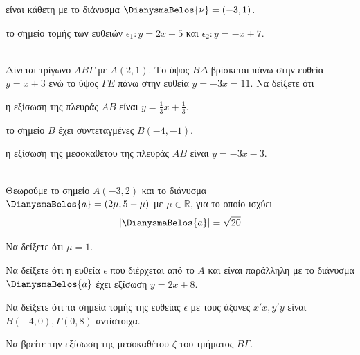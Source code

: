 \documentclass[twoside,nofonts,ektypwsh]{frontisthrio-diag}
\begin{document}
\begin{thema}
\begin{erwthma}
\item είναι κάθετη με το διάνυσμα $ \DianysmaBelos{\nu}=(-3,1) $.
\item το σημείο τομής των ευθειών $ \epsilon_1: y=2x-5 $ και $ \epsilon_2:y=-x+7 $.
\end{erwthma}
\item\mbox{}\\
Δίνεται τρίγωνο $ AB\varGamma $ με $ A(2,1) $. Το ύψος $ B\varDelta $ βρίσκεται πάνω στην ευθεία $ y=x+3 $ ενώ το ύψος $ \varGamma E $ πάνω στην ευθεία $ y=-3x=11 $. Να δείξετε ότι 
\begin{erwthma}
\item η εξίσωση της πλευράς $ AB $ είναι $ y=\frac{1}{3}x+\frac{1}{3} $.
\item  το σημείο $ B $ έχει συντεταγμένες $ B(-4,-1) $.
\item η εξίσωση της μεσοκαθέτου της πλευράς $ AB $ είναι $ y=-3x-3 $.
\end{erwthma}
\item\mbox{}\\
Θεωρούμε το σημείο $ A(-3,2) $ και το διάνυσμα $ \DianysmaBelos{a}=(2\mu,5-\mu) $ με $ \mu\in\mathbb{R} $, για το οποίο ισχύει
\[ |\DianysmaBelos{a}|=\sqrt{20} \]
\begin{erwthma}
\item Να δείξετε ότι $ \mu=1 $.
\item Να δείξετε ότι η ευθεία $ \epsilon $ που διέρχεται από το $ A $ και είναι παράλληλη με το διάνυσμα $ \DianysmaBelos{a} $ έχει εξίσωση $ y=2x+8 $.
\item Να δείξετε ότι τα σημεία τομής της ευθείας $ \epsilon $ με τους άξονες $ x'x,y'y $ είναι $ B(-4,0),\varGamma(0,8) $ αντίστοιχα.
\item Να βρείτε την εξίσωση της μεσοκαθέτου $ \zeta $ του τμήματος $ B\varGamma $.
\end{erwthma}
\end{thema}
\kaliepityxia
\end{document}
